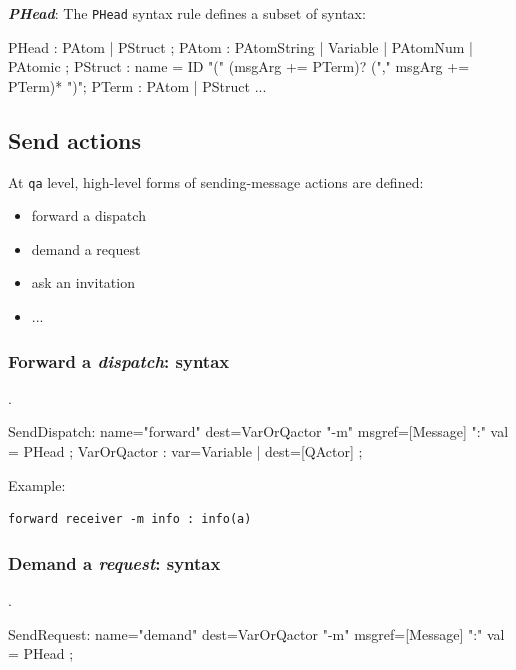 
\textbf{\textit{PHead}}:
The  \texttt{PHead}  syntax rule defines a subset of \prolog{}  syntax:

\begin{javacode}
	PHead : PAtom | PStruct ;
	PAtom : PAtomString | Variable | PAtomNum | PAtomic  ;
	PStruct : name = ID "(" (msgArg += PTerm)? ("," msgArg += PTerm)* ")"; 
	PTerm   : PAtom | PStruct ...
\end{javacode}
 
\subsection{Send actions}
At \texttt{qa} level, high-level forms of sending-message actions are defined:

\begin{itemize}
\item forward a dispatch
\item demand a request
\item ask an invitation
\item ...
\end{itemize}

\subsubsection{Forward a \textit{dispatch}: syntax}.
\medskip 
\begin{javacode}
SendDispatch: name="forward" dest=VarOrQactor "-m" msgref=[Message] ":" val = PHead ;
VarOrQactor : var=Variable  | dest=[QActor] ;
\end{javacode}

\noindent Example:
\begin{Verbatim}[fontsize=\scriptsize, frame=single]
forward receiver -m info : info(a)  
\end{Verbatim}	


\subsubsection{Demand a \textit{request}: syntax}. 
\medskip 
\begin{javacode}
SendRequest: name="demand" dest=VarOrQactor "-m" msgref=[Message] ":" val = PHead  ;
\end{javacode}


